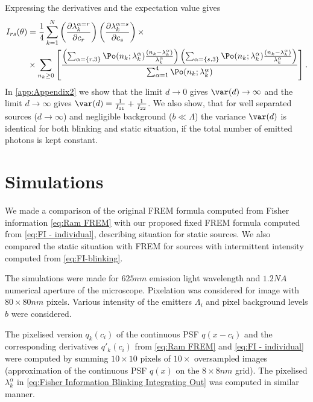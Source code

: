 Expressing the derivatives and the expectation value gives
%
\begin{alignat}{2}
	I_{rs}(\theta)
	&=\frac{1}{4}\sum_{k=1}^N\left(\frac{\partial\lambda_k^{\alpha=r}}{\partial c_r}\right)\left(\frac{\partial\lambda_k^{\alpha=s}}{\partial c_s}\right)\times \nonumber\\
	&\times \sum_{n_k\geq0}\left[\frac{\left(\sum_{\alpha=\{r,3\}}\Po(n_k;\lambda_k^\alpha)\frac{(n_k-\lambda_k^\alpha)}{\lambda_k^\alpha}\right)\left(\sum_{\alpha=\{s,3\}}\Po(n_k;\lambda_k^\alpha)\frac{(n_k-\lambda_k^\alpha)}{\lambda_k^\alpha}\right)}{\sum_{\alpha=1}^4\Po(n_k;\lambda_k^\alpha)}\right].
	\label{eq:FI-blinking}
\end{alignat}
%
In \autoref{app:Appendix2} we show that the limit $d\rightarrow0$ gives $\var(d)\rightarrow\infty$ and the limit $d\rightarrow\infty$ gives $\var(d)=\frac{1}{I_{11}}+\frac{1}{I_{22}}$. We also show, that for well separated sources ($d\rightarrow\infty$) and negligible background ($b\ll\Lambda$) the variance $\var(d)$ is identical for both blinking and static situation, if the total number of emitted photons is kept constant. 

\clearpage
\section{Simulations\label{sec:FREM simulations}} 
We made a comparison of the original FREM formula computed from Fisher information \autoref{eq:Ram FREM} with our proposed fixed FREM formula computed from \autoref{eq:FI - individual}, describing situation for static sources. We also compared the static situation with FREM for sources with intermittent intensity computed from \autoref{eq:FI-blinking}.

The simulations were made for $625\unit{nm}$ emission light wavelength and $1.2\unit{NA}$ numerical aperture of the microscope. Pixelation was considered for image with $80\times80\unit{nm}$ pixels. Various intensity of the emitters $\Lambda_i$ and pixel background levels $b$ were considered.

The pixelised version $q_k(c_i)$ of the continuous PSF $q(x-c_i)$ and the corresponding derivatives $q'_k(c_i)$ from \autoref{eq:Ram FREM} and \autoref{eq:FI - individual} were computed by summing $10\times10$ pixels of $10\times$ oversampled images (approximation of the continuous PSF $q(x)$ on the $8\times8 \unit{nm}$ grid). The pixelised $\lambda^\alpha_k$ in \autoref{eq:Fisher Information Blinking Integrating Out} was computed in similar manner. 

